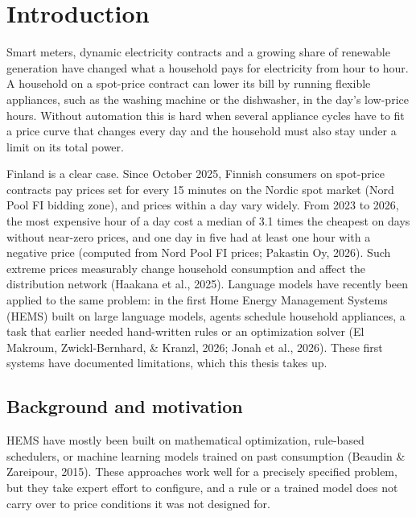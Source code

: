 \documentclass[12pt,a4paper]{report}
\begin{document}
\tableofcontents

\chapter{Introduction}
\label{ch:intro}

Smart meters, dynamic electricity contracts and a growing share of
renewable generation have changed what a household pays for electricity
from hour to hour. A household on a spot-price contract can lower its
bill by running flexible appliances, such as the washing machine or the
dishwasher, in the day's low-price hours. Without automation this is hard when
several appliance cycles have to fit a price curve that changes every
day and the household must also stay under a limit on its total power.

Finland is a clear case. Since October 2025, Finnish consumers on
spot-price contracts pay prices set for every 15 minutes on the Nordic
spot market (Nord Pool FI bidding zone), and prices within a day vary
widely. From 2023 to 2026,
the most expensive hour of a day cost a median of 3.1 times the cheapest
on days without near-zero prices, and one day in five had at least one
hour with a negative price (computed from Nord Pool FI prices; Pakastin
Oy, 2026). Such extreme prices measurably change household consumption
and affect the distribution network (Haakana et al., 2025). Language
models have recently been applied to the same problem: in the first
Home Energy Management Systems (HEMS) built on large language models,
agents schedule household appliances, a task that earlier needed
hand-written rules or an optimization solver (El Makroum, Zwickl-Bernhard, \& Kranzl, 2026;
Jonah et al., 2026). These first systems have documented limitations,
which this thesis takes up.

\section{Background and motivation}

HEMS have mostly been built on mathematical optimization, rule-based
schedulers, or machine learning models trained on past consumption
(Beaudin \& Zareipour, 2015). These approaches work well for a precisely
specified problem, but they take expert effort to configure, and a rule
or a trained model does not carry over to price conditions it was not
designed for.
\end{document}
